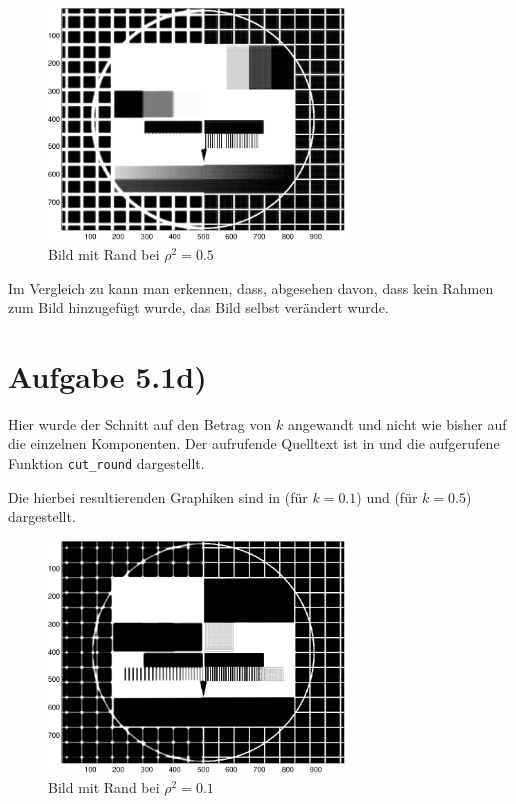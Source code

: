 \begin{figure}[htb]
\centering
  \includegraphics[width=0.7\textwidth,keepaspectratio]{../tmp/eins_c_0_5-crop.pdf}
  \caption{Bild mit Rand bei $ρ^2 = 0.5$}
  \label{fig:pic_trafo_0_5}
\end{figure}

Im Vergleich zu  kann man erkennen, dass, abgesehen davon, dass kein
Rahmen zum Bild hinzugefügt wurde, das Bild selbst verändert wurde. 

\section*{Aufgabe 5.1d)}
Hier wurde der Schnitt auf den Betrag von $k$ angewandt und nicht wie bisher
auf die einzelnen Komponenten. Der aufrufende Quelltext ist in  und 
die aufgerufene Funktion \texttt{cut\_round} dargestellt.




Die hierbei resultierenden Graphiken sind in  (für $k = 0.1$) und
 (für $k=0.5$) dargestellt.

\begin{figure}[htb]
\centering
  \includegraphics[width=0.7\textwidth,keepaspectratio]{../tmp/eins_d_0_1-crop.pdf}
  \caption{Bild mit Rand bei $ρ^2 = 0.1$}
  \label{fig:kreis_0_1}
\end{figure}

